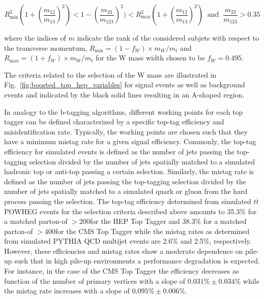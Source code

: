 \begin{description}
\begin{description}
\begin{description}
\begin{equation*}
R^2_{\mathrm{min}}(1+(\frac{m_{\mathrm{12}}}{m_{\mathrm{13}}})^2) < 1 - (\frac{m_{\mathrm{23}}}{m_{\mathrm{123}}})^2) < R^2_{\mathrm{max}}(1+(\frac{m_{\mathrm{12}}}{m_{\mathrm{13}}})^2) \; \; \mathrm{and} \; \; \frac{m_{\mathrm{23}}}{m_{\mathrm{123}}} > 0.35
\end{equation*}
\end{description}
where the indices of $m$ indicate the rank of the considered subjets with respect to the transverse momentum, $R_{\mathrm{min}} = (1 - f_{W}) \times m_W/m_t$ and $R_{\mathrm{max}} = (1 + f_{W}) \times m_W/m_t$ for the W mass width chosen to be $f_W = 0.495$.  
\end{description}
The criteria related to the selection of the W mass are illustrated in Fig.~\ref{fig:boosted_top_hep_variables} for signal events as well as background events and indicated by the black solid lines resulting in an A-shaped region.
\end{description}
In analogy to the b-tagging algorithms, different working points for each top tagger can be defined characterized by a specific top-tag efficiency and misidentification rate. Typically, the working points are chosen such that they have a minimum mistag rate for a given signal efficiency. Commonly, the top-tag efficiency for simulated events is defined as the number of jets passing the top-tagging selection divided by the number of jets spatially matched to a simulated hadronic top or anti-top passing a certain \pt selection. Similarly, the mistag rate is defined as the number of jets passing the top-tagging selection divided by the number of jets spatially matched to a simulated quark or gluon from the hard process passing the \pt selection. The top-tag efficiency determined from simulated $t\bar{t}$ POWHEG events for the selection criteria described above amounts to 35.3\% for a matched parton-\pt of $> 200$\gev for the HEP Top Tagger and 38.3\% for a matched parton-\pt of $> 400$\gev for the CMS Top Tagger while the mistag rates as determined from simulated PYTHIA QCD multijet events are 2.6\% and 2.5\%, respectively. However, these efficiencies and mistag rates show a moderate dependence on pile-up such that in high pile-up environments a performance degradation is expected. For instance, in the case of the CMS Top Tagger the efficiency decreases as function of the number of primary vertices with a slope of $0.031\% \pm 0.034\%$ while the mistag rate increases with a slope of $0.095\% \pm 0.006\%$.      


